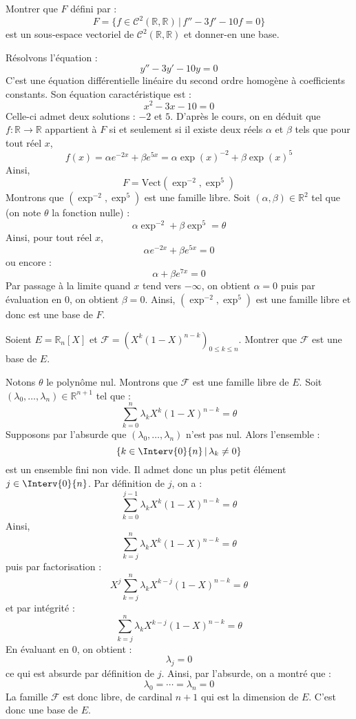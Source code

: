 \documentclass[a4paper,10pt]{report}
\begin{document}
\medskip


\begin{Exa} Montrer que $F$ défini par :
$$ F=\lbrace f \in \mathcal{C}^2(\mathbb{R}, \mathbb{R}) \, \vert \,  f''-3f'-10f= 0 \rbrace $$
est un sous-espace vectoriel de $\mathcal{C}^2(\mathbb{R}, \mathbb{R})$ et donner-en une base.
\end{Exa} 

\corr Résolvons l'équation :
$$ y''-3y'-10y = 0$$
C'est une équation différentielle linéaire du second ordre homogène à coefficients constants. Son équation caractéristique est :
$$ x^2-3x-10=0$$
Celle-ci admet deux solutions : $-2$ et $5$. D'après le cours, on en déduit que $f : \mathbb{R} \rightarrow \mathbb{R}$ appartient à $F$ si et seulement si il existe deux réels $\alpha$ et $\beta$ tels que pour tout réel $x$,
$$ f(x) = \alpha e^{-2x} + \beta e^{5x} = \alpha \exp(x)^{-2} + \beta \exp(x)^5$$
Ainsi,
$$ F = \textrm{Vect}(\exp^{-2}, \exp^5)$$
Montrons que $(\exp^{-2}, \exp^5)$ est une famille libre. Soit $(\alpha, \beta) \in \mathbb{R}^2$ tel que (on note $\theta$ la fonction nulle) :
$$ \alpha \exp^{-2} + \beta \exp^5 = \theta$$
Ainsi, pour tout réel $x$,
$$ \alpha e^{-2x} + \beta e^{5x} = 0$$
ou encore :
$$ \alpha  + \beta e^{7x} = 0$$
Par passage à la limite quand $x$ tend vers $- \infty$, on obtient $\alpha=0$ puis par évaluation en $0$, on obtient $\beta =0$. Ainsi, $(\exp^{-2}, \exp^5)$ est une famille libre et donc est une base de $F$.

\medskip

\begin{Exa} Soient $E= \mathbb{R}_n[X]$ et $\mathcal{F} = (X^k(1-X)^{n-k})_{0 \leq k \leq n}$. Montrer que $\mathcal{F}$ est une base de $E$.
\end{Exa}

\corr Notons $\theta$ le polynôme nul. Montrons que $\mathcal{F}$ est une famille libre de $E$. Soit $(\lambda_0, \ldots, \lambda_n) \in \mathbb{R}^{n+1}$ tel que :
$$ \sum_{k=0}^n \lambda_k X^k (1-X)^{n-k} = \theta$$
Supposons par l'absurde que $(\lambda_0, \ldots, \lambda_n)$ n'est pas nul. Alors l'ensemble :
$$ \lbrace k \in \Interv{0}{n} \, \vert \, \lambda_k \neq 0 \rbrace$$
est un ensemble fini non vide. Il admet donc un plus petit élément $j \in \Interv{0}{n}$. Par définition de $j$, on a :
$$ \sum_{k=0}^{j-1} \lambda_k X^k (1-X)^{n-k} = \theta$$
Ainsi,
$$ \sum_{k=j}^n \lambda_k X^k (1-X)^{n-k} = \theta$$
puis par factorisation :
$$ X^j \sum_{k=j}^n \lambda_k X^{k-j} (1-X)^{n-k} = \theta$$
et par intégrité :
$$ \sum_{k=j}^n \lambda_k X^{k-j} (1-X)^{n-k} = \theta$$
En évaluant en $0$, on obtient :
$$ \lambda_j = 0$$
ce qui est absurde par définition de $j$. Ainsi, par l'absurde, on a montré que :
$$ \lambda_0 = \cdots = \lambda_n = 0$$
La famille $\mathcal{F}$ est donc libre, de cardinal $n+1$ qui est la dimension de $E$. C'est donc une base de $E$.
\end{document}
